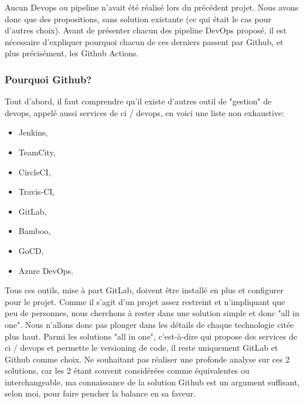 \documentclass[
    iai, %
    il, %
]{heig-tb}
\begin{document}
Aucun Devops ou pipeline n'avait été réalisé lors du précédent projet.
Nous avons donc que des propositions, sans solution existante (ce qui était le cas pour d'autres choix).
Avant de présenter chacun des pipeline DevOps proposé, il est nécessaire d'expliquer pourquoi chacun de ces derniers passent par Github, et plus précisément, les Github Actions.

\subsubsection{Pourquoi Github?}
Tout d'abord, il faut comprendre qu'il existe d'autres outil de "gestion" de \Gls{devops}, appelé aussi services de \Gls{ci} / \Gls{devops}, en voici une liste non exhaustive:
\begin{itemize}
    \item Jenkins, %
    \item TeamCity, %
    \item CircleCI, %
    \item Travis-CI, %
    \item GitLab, %
    \item Bamboo, %
    \item GoCD, %
    \item Azure DevOps. %
\end{itemize}

Tous ces outils, mise à part GitLab, doivent être installé en plus et configurer pour le projet.
Comme il s'agit d'un projet assez restreint et n'impliquant que peu de personnes, nous cherchons à rester dans une solution simple et donc "all in one".
Nous n'allons donc pas plonger dans les détails de chaque technologie citée plus haut.
Parmi les solutions "all in one", c'est-à-dire qui propose des services de \Gls{ci} / \Gls{devops} et permette le versioning de code, il reste uniquement GitLab et Github comme choix.
Ne souhaitant pas réaliser une profonde analyse sur ces 2 solutions, car les 2 étant souvent considérées comme équivalentes ou interchangeable, ma connaissance de la solution Github est un argument suffisant, selon moi, pour faire pencher la balance en sa faveur.

\end{document}
